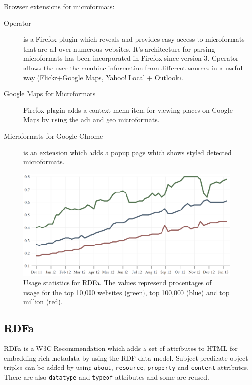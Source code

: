 \documentclass[12pt]{article}
\begin{document}
\noindent
Browser extensions for microformats:
\begin{description}
    \item[Operator] is a Firefox plugin which reveals and provides easy access
    to microformats that are all over numerous websites.\cite{ufExt} It's
    architecture for parsing microformats has been incorporated in Firefox since
    version 3. Operator allows the user the combine information from different
    sources in a useful way (Flickr+Google Maps, Yahoo! Local + Outlook).
    \item[Google Maps for Microformats] Firefox plugin adds a context menu item
    for viewing places on Google Maps by using the adr and geo microformats.
    \item[Microformats for Google Chrome] is an extension which adds a popup
    page which shows styled detected microformats.
\end{description}

\begin{figure}[b!]
    \centering
    \includegraphics[width=13cm]{rdfa-chart}
    \caption{Usage statistics for RDFa.\cite{rdfaStat} The values represend
    procentages of usage for the top 10,000 websites (green), top 100,000 (blue)
    and top million (red).}
    \label{rdfaChart}
\end{figure}

\subsection{RDFa}

RDFa is a W3C Recommendation which adds a set of attributes to HTML for
embedding rich metadata by using the RDF data model.\cite{rdfaWiki}
Subject-predicate-object triples can be added by using \texttt{about},
\texttt{resource}, \texttt{property} and \texttt{content} attributes. There are
also \texttt{datatype} and \texttt{typeof} attributes and some are reused.
\end{document}
